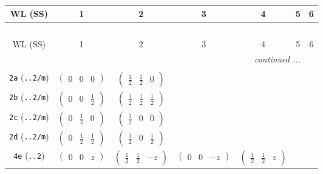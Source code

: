 \documentclass[fleqn,9pt,landscape]{jsarticle}
\begin{document}
\begin{center}
\renewcommand{\arraystretch}{1.2}
\begin{longtable}{ccccccc}
 \hline \hline
WL (SS) & 1 & 2 & 3 & 4 & 5 & 6 \\ \hline \endfirsthead

\multicolumn{6}{l}{\tablename\ \thetable{}} \\
 \hline \hline
WL (SS) & 1 & 2 & 3 & 4 & 5 & 6 \\ \hline \endhead

 \hline \hline
\multicolumn{6}{r}{\footnotesize\it continued ...} \\ \endfoot

 \hline \hline
\multicolumn{6}{r}{} \\ \endlastfoot

{\tt 2a} ({\tt ..2/m}) & $ \begin{pmatrix} 0 & 0 & 0 \end{pmatrix} $ & $ \begin{pmatrix} \frac{1}{2} & \frac{1}{2} & 0 \end{pmatrix} $ & $  $ & $  $ & $  $ & $  $ \\ \hline
{\tt 2b} ({\tt ..2/m}) & $ \begin{pmatrix} 0 & 0 & \frac{1}{2} \end{pmatrix} $ & $ \begin{pmatrix} \frac{1}{2} & \frac{1}{2} & \frac{1}{2} \end{pmatrix} $ & $  $ & $  $ & $  $ & $  $ \\ \hline
{\tt 2c} ({\tt ..2/m}) & $ \begin{pmatrix} 0 & \frac{1}{2} & 0 \end{pmatrix} $ & $ \begin{pmatrix} \frac{1}{2} & 0 & 0 \end{pmatrix} $ & $  $ & $  $ & $  $ & $  $ \\ \hline
{\tt 2d} ({\tt ..2/m}) & $ \begin{pmatrix} 0 & \frac{1}{2} & \frac{1}{2} \end{pmatrix} $ & $ \begin{pmatrix} \frac{1}{2} & 0 & \frac{1}{2} \end{pmatrix} $ & $  $ & $  $ & $  $ & $  $ \\ \hline
{\tt 4e} ({\tt ..2}) & $ \begin{pmatrix} 0 & 0 & z \end{pmatrix} $ & $ \begin{pmatrix} \frac{1}{2} & \frac{1}{2} & - z \end{pmatrix} $ & $ \begin{pmatrix} 0 & 0 & - z \end{pmatrix} $ & $ \begin{pmatrix} \frac{1}{2} & \frac{1}{2} & z \end{pmatrix} $ & $  $ & $  $ \\ \hline

\end{longtable}
\end{center}
\end{document}
